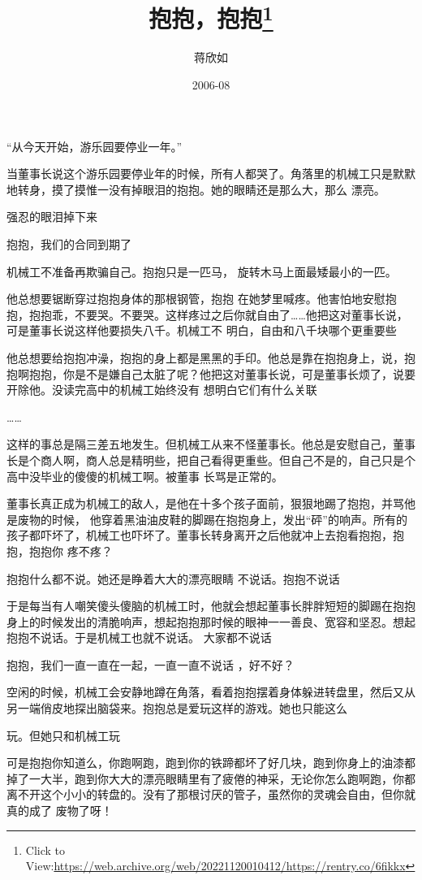 \documentclass{article}
\title{抱抱，抱抱\footnote{Click to View:\url{https://web.archive.org/web/20221120010412/https://rentry.co/6fikkx}}}
\author{蒋欣如}
\date{2006-08}
\begin{document}

\maketitle


\Large


﻿“从今天开始，游乐园要停业一年。” 

当董事长说这个游乐园要停业年的时候，所有人都哭了。角落里的机械工只是默默地转身，摸了摸惟一没有掉眼泪的抱抱。她的眼睛还是那么大，那么
漂亮。 


强忍的眼泪掉下来 


抱抱，我们的合同到期了 

机械工不准备再欺骗自己。抱抱只是一匹马，
旋转木马上面最矮最小的一匹。 

他总想要锯断穿过抱抱身体的那根钢管，抱抱
\newpage
在她梦里喊疼。他害怕地安慰抱抱，抱抱乖，不要哭。不要哭。这样疼过之后你就自由了……他把这对董事长说，可是董事长说这样他要损失八千。机械工不
明白，自由和八千块哪个更重要些 

他总想要给抱抱冲澡，抱抱的身上都是黑黑的手印。他总是靠在抱抱身上，说，抱抱啊抱抱，你是不是嫌自己太脏了呢？他把这对董事长说，可是董事长烦了，说要开除他。没读完高中的机械工始终没有
想明白它们有什么关联 


…… 

这样的事总是隔三差五地发生。但机械工从来不怪董事长。他总是安慰自己，董事长是个商人啊，商人总是精明些，把自己看得更重些。但自己不是的，自己只是个高中没毕业的傻傻的机械工啊。被董事
长骂是正常的。 

董事长真正成为机械工的敌人，是他在十多个孩子面前，狠狠地踢了抱抱，并骂他是废物的时候，
\newpage
他穿着黑油油皮鞋的脚踢在抱抱身上，发出“砰”的响声。所有的孩子都吓坏了，机械工也吓坏了。董事长转身离开之后他就冲上去抱看抱抱，抱抱，抱抱你
疼不疼？ 

抱抱什么都不说。她还是睁着大大的漂亮眼睛
不说话。抱抱不说话 

于是每当有人嘲笑傻头傻脑的机械工时，他就会想起董事长胖胖短短的脚踢在抱抱身上的时候发出的清脆响声，想起抱抱那时候的眼神一一善良、宽容和坚忍。想起抱抱不说话。于是机械工也就不说话。
大家都不说话 

抱抱，我们一直一直在一起，一直一直不说话
，好不好？ 

空闲的时候，机械工会安静地蹲在角落，看着抱抱摆着身体躲进转盘里，然后又从另一端俏皮地探出脑袋来。抱抱总是爱玩这样的游戏。她也只能这么

\newpage
玩。但她只和机械工玩 

可是抱抱你知道么，你跑啊跑，跑到你的铁蹄都坏了好几块，跑到你身上的油漆都掉了一大半，跑到你大大的漂亮眼睛里有了疲倦的神采，无论你怎么跑啊跑，你都离不开这个小小的转盘的。没有了那根讨厌的管子，虽然你的灵魂会自由，但你就真的成了
废物了呀！ 
\end{document}
